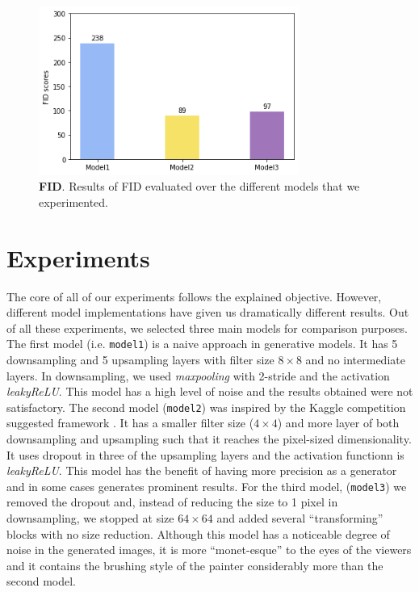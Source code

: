 \documentclass[10pt,twocolumn,letterpaper]{article}
\begin{document}
\begin{figure}
	\includegraphics[width=23em]{fid.png}
	\caption{\textbf{FID}. Results of FID evaluated over the different models that we experimented.}
	\label{figure:fid}
\end{figure}

\section{Experiments}
The core of all of our experiments follows the explained objective. However, different model implementations have given us dramatically different results. Out of all these experiments, we selected three main models for comparison purposes. The first model (i.e. \texttt{model1}) is a naive approach in generative models. It has 5 downsampling and 5 upsampling layers with filter size $8 \times 8$ and no intermediate layers. In downsampling, we used \textit{maxpooling} with 2-stride and the activation \textit{leakyReLU}. This model has a high level of noise and the results obtained were not satisfactory. The second model (\texttt{model2}) was inspired by the Kaggle competition suggested framework \cite{kaggle}. It has a smaller filter size ($4 \times 4$) and more layer of both downsampling and upsampling such that it reaches the pixel-sized dimensionality. It uses dropout in three of the upsampling layers and the activation functionn is \textit{leakyReLU}. This model has the benefit of having more precision as a generator and in some cases generates prominent results. For the third model, (\texttt{model3}) we removed the dropout and, instead of reducing the size to 1 pixel in downsampling, we stopped at size $64 \times 64$ and added several “transforming” blocks with no size reduction. Although this model has a noticeable degree of noise in the generated images, it is more “monet-esque” to the eyes of the viewers and it contains the brushing style of the painter considerably more than the second model. 
\end{document}
